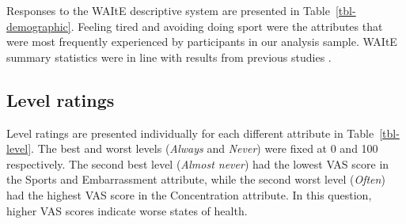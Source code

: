 \documentclass[
  number,
  preprint]{elsarticle}
\begin{document}
Responses to the WAItE descriptive system are presented in
Table~\ref{tbl-demographic}. Feeling tired and avoiding doing sport were
the attributes that were most frequently experienced by participants in
our analysis sample. WAItE summary statistics were in line with results
from previous studies \citep{Robinson2019EstimatingEvaluation}.

\subsection{Level ratings}\label{level-ratings-1}

Level ratings are presented individually for each different attribute in
Table~\ref{tbl-level}. The best and worst levels (\emph{Always} and
\emph{Never}) were fixed at 0 and 100 respectively. The second best
level (\emph{Almost never}) had the lowest VAS score in the Sports and
Embarrassment attribute, while the second worst level (\emph{Often}) had
the highest VAS score in the Concentration attribute. In this question,
higher VAS scores indicate worse states of health.

\newpage
\end{document}
